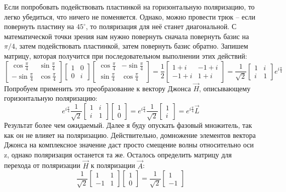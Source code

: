 Если попробовать подействовать пластинкой на горизонтальную поляризацию, то легко убедиться, что ничего не поменяется. Однако, можно провести трюк -- если повернуть пластину на $45^{\circ}$, то поляризация для неё станет диагональной. С математической точки зрения нам нужно повернуть сначала повернуть базис на $\pi/4$, затем подействовать пластинкой, затем повернуть базис обратно. Запишем матрицу, которая получится при последовательном выполнении этих действий:
\[
\begin{bmatrix} \cos \frac{\pi}{4} & \sin \frac{\pi}{4} \\ -\sin \frac{\pi}{4} & \cos \frac{\pi}{4} \end{bmatrix} \begin{bmatrix} 1 & 0 \\ 0 & i \end{bmatrix} \begin{bmatrix} \cos \frac{\pi}{4} & -\sin \frac{\pi}{4} \\ \sin \frac{\pi}{4} & \cos \frac{\pi}{4} \end{bmatrix} = \frac{1}{2} \begin{bmatrix} 1 + i& -1 + i \\ -1 + i & 1 + i \end{bmatrix} = \frac{1}{\sqrt{2}}\begin{bmatrix} 1 & i \\ i & 1 \end{bmatrix}e^{i\frac{\pi}{4}}
\]
Попробуем применить это преобразование к вектору Джонса $\Vec{H}$, описывающему горизонтальную поляризацию:
\[
e^{i\frac{\pi}{4}}\frac{1}{\sqrt{2}}\begin{bmatrix} 1 & i \\ i & 1 \end{bmatrix}\begin{bmatrix} 1  \\ 0 \end{bmatrix} = e^{i\frac{\pi}{4}}\frac{1}{\sqrt{2}}\begin{bmatrix} 1  \\ i \end{bmatrix} = e^{i\frac{\pi}{4}}\Vec{L}
\]
Результат более чем ожидаемый. Далее я буду опускать фазовый множитель, так как он не влияет на поляризацию. Действительно, домножение элементов вектора Джонса на комплексное значение даст просто смещение волны относительно оси z, однако поляризация останется та же. Осталось определить матрицу для перехода от поляризации $\Vec{H}$ к поляризации $\Vec{A}$:
\[
\frac{1}{\sqrt{2}}\begin{bmatrix} 1 & 1 \\ -1 & 1 \end{bmatrix}\begin{bmatrix} 1  \\ 0 \end{bmatrix} = \frac{1}{\sqrt{2}}\begin{bmatrix} 1  \\ -1 \end{bmatrix}
\]
